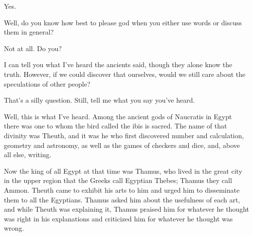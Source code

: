 \sayphaedrus Yes.

\saysocrates Well, do you know how best to please god when you either use
words or discuss them in general?

\sayphaedrus Not at all. Do you?

\saysocrates I can tell you what I've heard the ancients said, though they 
alone know the truth. However, if we could discover that
ourselves, would we still care about the speculations of other people?

\sayphaedrus That's a silly question. Still, tell me what you say you've
heard.

\saysocrates Well, this is what I've heard. Among the ancient gods of
Naucratis in Egypt
there was one to whom the bird called the ibis is sacred. The name of
that divinity was
Theuth, and it was he
who first discovered number and calculation, geometry and astronomy, as
well as the games of checkers and dice, and, above all else,
writing.

Now the king of all Egypt at that time was
Thamus, who lived in
the great city in the upper region that the Greeks call Egyptian Thebes;
Thamus they call
Ammon. Theuth came to
exhibit his arts to him and urged him to disseminate them to all the
Egyptians. Thamus asked him about the usefulness of each art, and while
Theuth was explaining it, Thamus praised him for whatever he
thought was right in his explanations and criticized him for whatever he
thought was wrong.

